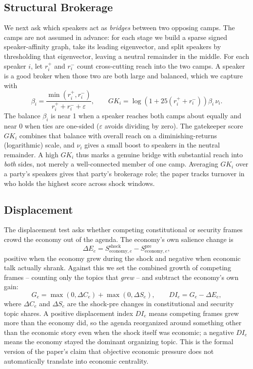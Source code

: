 \documentclass[11pt]{article}
\begin{document}
\subsection{Structural Brokerage}
We next ask which speakers act as \emph{bridges} between two opposing camps. The camps are not assumed in advance: for each stage we build a sparse signed speaker-affinity graph, take its leading eigenvector, and split speakers by thresholding that eigenvector, leaving a neutral remainder in the middle. For each speaker $i$, let $r_i^+$ and $r_i^-$ count cross-cutting reach into the two camps. A speaker is a good broker when those two are both large and balanced, which we capture with
\begin{equation}
\beta_i = \frac{\min(r_i^+,r_i^-)}{r_i^+ + r_i^- + \varepsilon},
\qquad
GK_i = \log\!\left(1 + 25(r_i^+ + r_i^-)\right)\beta_i\, \nu_i.
\end{equation}
The balance $\beta_i$ is near 1 when a speaker reaches both camps about equally and near 0 when ties are one-sided ($\varepsilon$ avoids dividing by zero). The gatekeeper score $GK_i$ combines that balance with overall reach on a diminishing-returns (logarithmic) scale, and $\nu_i$ gives a small boost to speakers in the neutral remainder. A high $GK_i$ thus marks a genuine bridge with substantial reach into \emph{both} sides, not merely a well-connected member of one camp. Averaging $GK_i$ over a party's speakers gives that party's brokerage role; the paper tracks turnover in who holds the highest score across shock windows.

\subsection{Displacement}
The displacement test asks whether competing constitutional or security frames crowd the economy out of the agenda. The economy's own salience change is
\begin{equation}
\Delta E_e = S^{\text{shock}}_{\text{economy},e} - S^{\text{pre}}_{\text{economy},e},
\end{equation}
positive when the economy grew during the shock and negative when economic talk actually shrank. Against this we set the combined growth of competing frames -- counting only the topics that \emph{grew} -- and subtract the economy's own gain:
\begin{equation}
G_e = \max(0,\Delta C_e) + \max(0,\Delta S_e),
\qquad
DI_e = G_e - \Delta E_e,
\end{equation}
where $\Delta C_e$ and $\Delta S_e$ are the shock-pre changes in constitutional and security topic shares. A positive displacement index $DI_e$ means competing frames grew more than the economy did, so the agenda reorganized around something other than the economic story even when the shock itself was economic; a negative $DI_e$ means the economy stayed the dominant organizing topic. This is the formal version of the paper's claim that objective economic pressure does not automatically translate into economic centrality.
\end{document}
